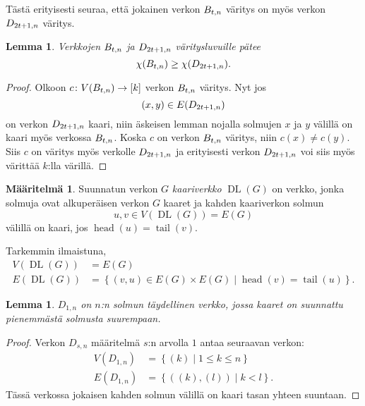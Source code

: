 \documentclass[finnish]{tktltiki2}
\newtheorem{lem}[lau]{Lemma}
\theoremstyle{definition}
\newtheorem{maar}[lau]{Määritelmä}
\theoremstyle{remark}
\newcommand{\set}[1]{\left\{ #1 \right\}}
\newcommand{\from}{\colon}
\DeclareMathOperator{\head}{head}
\DeclareMathOperator{\tail}{tail}
\DeclareMathOperator{\DL}{DL}
\newcommand{\Dsn}{D_{s,n}}
\begin{document}
Tästä erityisesti seuraa, että jokainen verkon $B_{t,n}$ väritys on myös verkon
$D_{2t+1,n}$ väritys.

\begin{lem}
    Verkkojen $B_{t,n}$ ja $D_{2t+1,n}$ väritysluvuille pätee
    \begin{equation*}
        \chi(B_{t,n}) \geq \chi(D_{2t+1,n}).
    \end{equation*}
\end{lem}

\begin{proof}
    Olkoon $c \from V(\Btn) \to [k]$ verkon $B_{t,n}$ väritys. Nyt jos
    \begin{equation*}
            (x,y) \in E(D_{2t+1,n})
    \end{equation*}
    on verkon $D_{2t+1,n}$ kaari, niin äskeisen lemman nojalla solmujen $x$ ja
    $y$ välillä on kaari myös verkossa $B_{t,n}$. Koska $c$ on verkon $B_{t,n}$
    väritys, niin $c(x) \neq c(y)$. Siis $c$ on väritys myös verkolle $D_{2t+1,n}$ ja
    erityisesti verkon $D_{2t+1,n}$ voi siis myös värittää $k$:lla värillä.
\end{proof}


\begin{maar}
    Suunnatun verkon $G$ \emph{kaariverkko} $\DL(G)$ on verkko, jonka solmuja ovat
    alkuperäisen verkon $G$ kaaret ja kahden kaariverkon solmun
    \begin{equation*}
        u,v \in V(\DL(G)) = E(G)
    \end{equation*}
    välillä on kaari, jos $\head(u) = \tail(v)$.
\end{maar}


Tarkemmin ilmaistuna,
%
\begin{align*}
    V(\DL(G)) &= E(G) \\
    E(\DL(G)) &= \set{(v,u) \in E(G) \times E(G) \mid \head(v) = \tail(u)}.
\end{align*}


\begin{lem}
    $D_{1,n}$ on $n$:n solmun täydellinen verkko, jossa kaaret on suunnattu
    pienemmästä solmusta suurempaan.
\end{lem}

\begin{proof}
    Verkon $\Dsn$ määritelmä $s$:n arvolla $1$ antaa seuraavan verkon:
    \begin{align*}
        V(D_{1,n}) &= \set{(k) \mid 1 \leq k \leq n} \\
        E(D_{1,n}) &= \set{((k), (l)) \mid k < l}.
    \end{align*}
    Tässä verkossa jokaisen kahden solmun välillä on kaari tasan yhteen
    suuntaan.
\end{proof}
\end{document}
